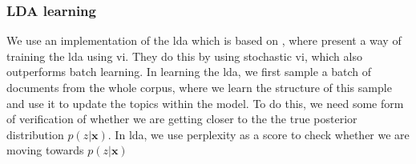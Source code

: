 \subsubsection*{LDA learning}
We use an implementation of the \gls{lda} which is based on \cite{blei2010online}, where \citeauthor{blei2010online} present a way of training the \gls{lda} using \gls{vi}.
They do this by using stochastic \gls{vi}, which also outperforms batch learning.
In learning the \gls{lda}, we first sample a batch of documents from the whole corpus, where we learn the structure of this sample and use it to update the topics within the model.
To do this, we need some form of verification of whether we are getting closer to the the true posterior distribution $p(z|\textbf{x})$.
In \gls{lda}, we use perplexity as a score to check whether we are moving towards $p(z|\textbf{x})$
